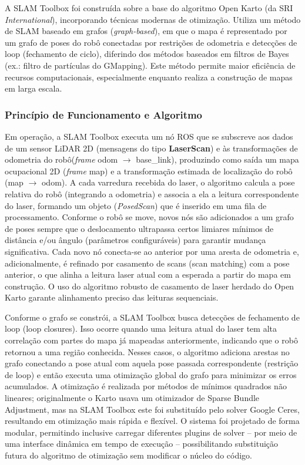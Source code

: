     A SLAM Toolbox foi construída sobre a base do algoritmo Open Karto (da SRI \textit{International}), incorporando técnicas modernas de otimização. Utiliza um método de SLAM baseado em grafos (\textit{graph-based}), em que o mapa é representado por um grafo de poses do robô conectadas por restrições de odometria e detecções de loop (fechamento de ciclo), diferindo dos métodos baseados em filtros de Bayes (ex.: filtro de partículas do GMapping). Este método permite maior eficiência de recursos computacionais, especialmente enquanto realiza a construção de mapas em larga escala.

    \subsubsection{Princípio de Funcionamento e Algoritmo}

    Em operação, a SLAM Toolbox executa um nó ROS que se subscreve aos dados de um sensor LiDAR 2D (mensagens do tipo \textbf{LaserScan}) e às transformações de odometria do robô(\textit{frame} odom $\rightarrow$ base\_link), produzindo como saída um mapa ocupacional 2D (\textit{frame} map) e a transformação estimada de localização do robô (map $\rightarrow$ odom). A cada varredura recebida do laser, o algoritmo calcula a pose relativa do robô (integrando a odometria) e associa a ela a leitura correspondente do laser, formando um objeto (\textit{PosedScan}) que é inserido em uma fila de processamento. Conforme o robô se move, novos nós são adicionados a um grafo de poses sempre que o deslocamento ultrapassa certos limiares mínimos de distância e/ou ângulo (parâmetros configuráveis) para garantir mudança significativa. Cada novo nó conecta-se ao anterior por uma aresta de odometria e, adicionalmente, é refinado por casamento de scans (scan matching) com a pose anterior, o que alinha a leitura laser atual com a esperada a partir do mapa em construção. O uso do algoritmo robusto de casamento de laser herdado do Open Karto garante alinhamento preciso das leituras sequenciais.

    Conforme o grafo se constrói, a SLAM Toolbox busca detecções de fechamento de loop (loop closures). Isso ocorre quando uma leitura atual do laser tem alta correlação com partes do mapa já mapeadas anteriormente, indicando que o robô retornou a uma região conhecida. Nesses casos, o algoritmo adiciona arestas no grafo conectando a pose atual com aquela pose passada correspondente (restrição de loop) e então executa uma otimização global do grafo para minimizar os erros acumulados. A otimização é realizada por métodos de mínimos quadrados não lineares; originalmente o Karto usava um otimizador de Sparse Bundle Adjustment, mas na SLAM Toolbox este foi substituído pelo solver Google Ceres, resultando em otimização mais rápida e flexível\cite{Macenski2021}. O sistema foi projetado de forma modular, permitindo inclusive carregar diferentes plugins de solver – por meio de uma interface dinâmica em tempo de execução – possibilitando substituição futura do algoritmo de otimização sem modificar o núcleo do código.

